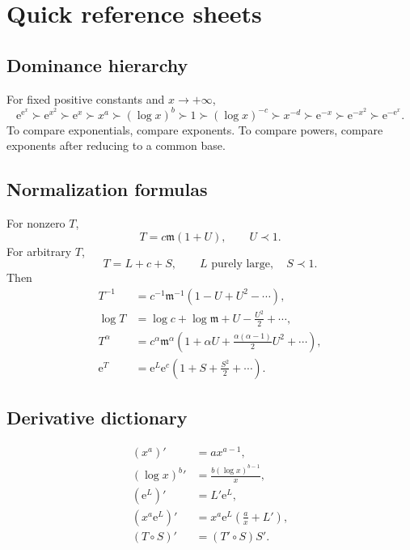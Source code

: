 \documentclass[11pt,oneside,openany]{book}
\newcommand{\e}{\mathrm{e}}
\newcommand{\mon}{\mathfrak{m}}
\newcommand{\compose}{\mathbin{\circ}}
\theoremstyle{plain}
\theoremstyle{definition}
\theoremstyle{remark}
\begin{document}
\chapter{Quick reference sheets}
\label{app:reference}

\section{Dominance hierarchy}
For fixed positive constants and $x\to+\infty$,
\[
  \e^{\e^x}\succ\e^{x^2}\succ\e^x
  \succ x^a\succ(\log x)^b\succ1
  \succ(\log x)^{-c}\succ x^{-d}
  \succ\e^{-x}\succ\e^{-x^2}\succ\e^{-\e^x}.
\]
To compare exponentials, compare exponents. To compare powers, compare exponents after reducing to a common base.

\section{Normalization formulas}
For nonzero $T$,
\[
  T=c\mon(1+U),
  \qquad U\prec1.
\]
For arbitrary $T$,
\[
  T=L+c+S,
  \qquad L\text{ purely large},
  \quad S\prec1.
\]
Then
\[
\begin{aligned}
  T^{-1}&=c^{-1}\mon^{-1}(1-U+U^2-\cdots),\\
  \log T&=\log c+\log\mon+U-\frac{U^2}{2}+\cdots,\\
  T^\alpha&=c^\alpha\mon^\alpha
  \left(1+\alpha U+\frac{\alpha(\alpha-1)}2U^2+\cdots\right),\\
  \e^T&=\e^L\e^c\left(1+S+\frac{S^2}{2}+\cdots\right).
\end{aligned}
\]

\section{Derivative dictionary}
\[
\begin{aligned}
  (x^a)'&=ax^{a-1},\\
  (\log x)^b{}'&=\frac{b(\log x)^{b-1}}x,\\
  (\e^L)'&=L'\e^L,\\
  (x^a\e^L)'&=x^a\e^L\left(\frac ax+L'\right),\\
  (T\compose S)'&=(T'\compose S)S'.
\end{aligned}
\]
\end{document}

